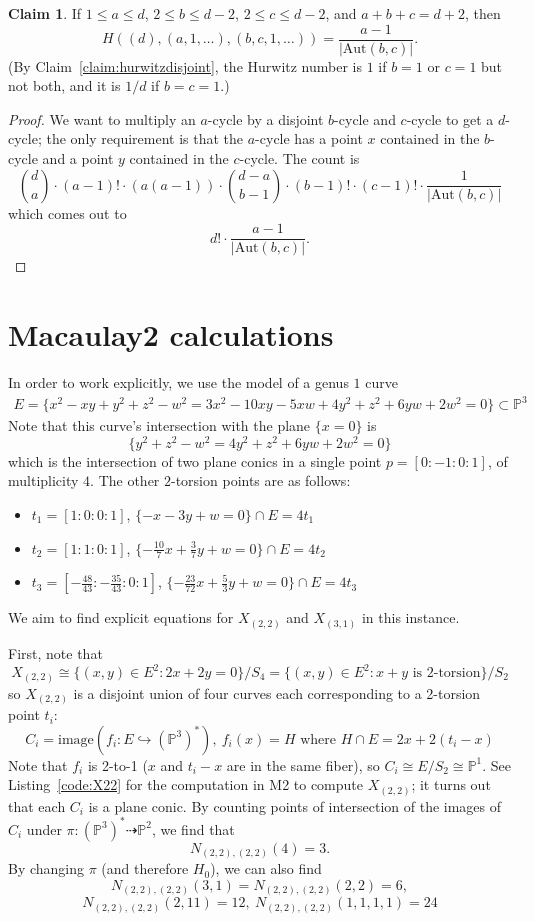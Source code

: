 \documentclass[thesis]{thesis-umich}           %
\newcommand{\Aut}{\text{Aut}}
\renewcommand{\P}{\mathbb P}
\theoremstyle{definition}
\newtheorem{claim}[thm]{Claim}
\begin{document}
\begin{claim}
  If $1\leq a\leq d$, $2\leq b\leq d-2$, $2\leq c\leq d-2$, and $a+b+c=d+2$, then
  \[
  H((d),(a,1,\dots),(b,c,1,\dots))=\frac{a-1}{|\Aut(b,c)|}.
  \]
  (By Claim~\ref{claim:hurwitzdisjoint}, the Hurwitz number is $1$ if $b=1$ or $c=1$ but not both, and it is $1/d$ if $b=c=1$.)
\end{claim}
\begin{proof}
  We want to multiply an $a$-cycle by a disjoint $b$-cycle and $c$-cycle to get a $d$-cycle; the only
  requirement is that the $a$-cycle has a point $x$ contained in the $b$-cycle and a point $y$ contained in the
  $c$-cycle.
  The count is
  \[
  \binom da\cdot (a-1)!\cdot (a(a-1))\cdot \binom{d-a}{b-1}\cdot (b-1)!\cdot (c-1)!\cdot \frac 1{|\Aut(b,c)|}
  \]
  which comes out to
  \[
  d!\cdot\frac{a-1}{|\Aut(b,c)|}.
  \]
\end{proof}

\chapter{Macaulay2 calculations}
\label{appendix:code}

In order to work explicitly, we use the model of a genus $1$ curve
\begin{align*}
E=\{x^2-xy+y^2+z^2-w^2= 3x^2-10xy-5xw+4y^2+z^2+6yw+2w^2=0\}\subset\P^3
\end{align*}
Note that this curve's intersection with the plane $\{x=0\}$
is
\[
\{y^2+z^2-w^2=4y^2+z^2+6yw+2w^2=0\}
\]
which is the intersection of two plane conics in a single point $p=[0:-1:0:1]$,
of multiplicity $4$. The other $2$-torsion points are as follows:
\begin{itemize}
\item $t_1=[1:0:0:1]$, $\{-x-3y+w=0\}\cap E=4t_1$
\item $t_2=[1:1:0:1]$, $\{-\frac{10}7 x+\frac 37 y+w=0\}\cap E=4t_2$
  \item $t_3=[-\frac{48}{43}:-\frac{35}{43}:0:1]$, $\{-\frac{23}{72} x+\frac 53 y+w=0\}\cap E=4t_3$
\end{itemize}
We aim to find explicit equations for $X_{(2,2)}$ and $X_{(3,1)}$ in this instance.

First, note that \[X_{(2,2)}\cong\{(x,y)\in E^2:2x+2y=0\}/S_4=\{(x,y)\in E^2:x+y\text{ is 2-torsion}\}/S_2\]
so $X_{(2,2)}$ is a disjoint union of four curves each corresponding to a 2-torsion point $t_i$:
\[
C_i=\text{image}(f_i:E\hookrightarrow(\P^3)^*),\ f_i(x)=H\text{ where }H\cap E=2x+2(t_i-x)
\]
Note that $f_i$ is 2-to-1 ($x$ and $t_i-x$ are in the same fiber), so $C_i\cong E/S_2\cong\P^1$. See Listing~\ref{code:X22} for the computation in M2 to compute $X_{(2,2)}$; it turns out that each $C_i$ is a plane conic. By counting points of
intersection of the images of $C_i$ under $\pi:(\P^3)^*\dashrightarrow\P^2$, we find that
\[
N_{(2,2),(2,2)}(4)=3.
\]
By changing $\pi$ (and therefore $H_0$), we can also find
\[
N_{(2,2),(2,2)}(3,1)=N_{(2,2),(2,2)}(2,2)=6,\]\[ N_{(2,2),(2,2)}(2,11)=12,\ N_{(2,2),(2,2)}(1,1,1,1)=24
\]
\end{document}
